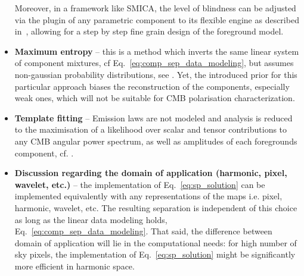 \begin{itemize}
Moreover, in a framework like SMICA, the level of blindness can be adjusted via the plugin of any parametric component to its flexible engine as described in~\cite{cardoso08}, allowing for a step by step fine grain design of the foreground model.\\
	\item \textbf{Maximum entropy} --  this is a method which inverts the same linear system of component mixtures, cf Eq.~\ref{eq:comp_sep_data_modeling}, but assumes non-gaussian probability distributions, see \cite{hobson98,stolyarov02}. Yet, the introduced prior for this particular approach biases the reconstruction of the components, especially weak ones, which will not be suitable for CMB polarisation characterization.
	\item \textbf{Template fitting} -- 	Emission laws are not modeled and analysis is reduced to the maximisation of a likelihood over scalar and tensor contributions to any CMB angular power spectrum, as well as amplitudes of each foregrounds component, cf. \cite{katayama11}.
	\item \textbf{Discussion regarding the domain of application (harmonic, pixel, wavelet, etc.)} -- the implementation of Eq.~\ref{eq:sp_solution} can be implemented equivalently with any representations of the maps i.e. pixel, harmonic, wavelet, etc. The resulting separation is independent of this choice as long as the linear data modeling holds, Eq.~\ref{eq:comp_sep_data_modeling}. That said, the difference between domain of application will lie in the computational needs: for high number of sky pixels, the implementation of Eq.~\ref{eq:sp_solution} might be significantly more efficient in harmonic space.
\end{itemize}


